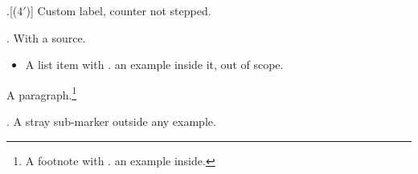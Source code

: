

\ex.[(4$'$)] Custom label, counter not stepped.

\ex. With a source. 

\begin{itemize}
\item A list item with \ex. an example inside it, out of scope.
\end{itemize}

A paragraph.\footnote{A footnote with \ex. an example inside.}

\a. A stray sub-marker outside any example.

